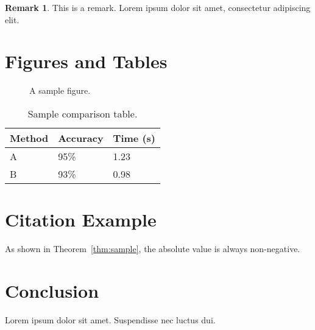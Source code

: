 \documentclass[11pt]{article}
\theoremstyle{definition}
\theoremstyle{italicremark}
\newtheorem{remark}[theorem]{Remark}
\begin{document}
\begin{remark}
This is a remark. Lorem ipsum dolor sit amet, consectetur adipiscing elit.
\end{remark}

\section{Figures and Tables}

\begin{figure}[H]
  \centering
  \fbox{\rule{0pt}{2in} \rule{2in}{0pt}}
  \caption{A sample figure.}
  \label{fig:sample}
\end{figure}

\begin{table}[H]
\centering
\begin{tabular}{@{}lll@{}}
\toprule
Method & Accuracy & Time (s) \\
\midrule
A & 95\% & 1.23 \\
B & 93\% & 0.98 \\
\bottomrule
\end{tabular}
\caption{Sample comparison table.}
\label{tab:comparison}
\end{table}

\section{Citation Example}

As shown in Theorem~\ref{thm:sample}, the absolute value is always non-negative.

\section{Conclusion}
Lorem ipsum dolor sit amet. Suspendisse nec luctus dui. 



\end{document}
